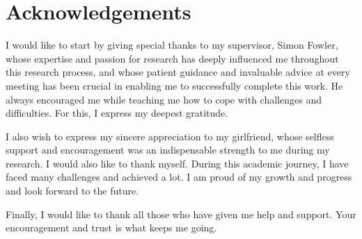 \documentclass{l4proj}
\begin{document}
\begin{minipage}{\textwidth}

\chapter*{Acknowledgements}
I would like to start by giving special thanks to my supervisor, Simon Fowler, whose expertise and passion for research has deeply influenced me throughout this research process, and whose patient guidance and invaluable advice at every meeting has been crucial in enabling me to successfully complete this work. He always encouraged me while teaching me how to cope with challenges and difficulties. For this, I express my deepest gratitude.

I also wish to express my sincere appreciation to my girlfriend, whose selfless support and encouragement was an indispensable strength to me during my research. I would also like to thank myself. During this academic journey, I have faced many challenges and achieved a lot. I am proud of my growth and progress and look forward to the future.

Finally, I would like to thank all those who have given me help and support. Your encouragement and trust is what keeps me going.

\end{minipage}

\vspace{\fill}\null 



%
%
\def\consentname {Kai Wang} %
\def\consentdate {10 March 2024} %
%
\educationalconsent


\tableofcontents
\end{document}
